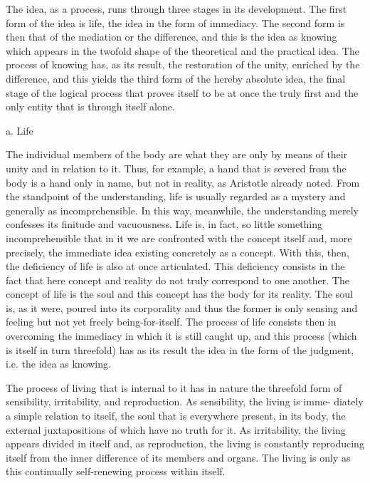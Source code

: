 The idea, as a process, runs through three stages in its development.
The first form of the idea is life, the idea in the form of immediacy.
The second form is then that of the mediation or the difference, and
this is the idea as knowing which appears in the twofold shape of
the theoretical and the practical idea.
The process of knowing has, as its result,
the restoration of the unity, enriched by the difference, and
this yields the third form of the hereby absolute idea,
the final stage of the logical process that proves itself to be at once
the truly first and the only entity that is through itself alone.

a. Life

The individual members of the body are what they are only by means
of their unity and in relation to it. Thus, for example, a hand that is severed
from the body is a hand only in name, but not in reality, as
Aristotle already noted. From the standpoint of the understanding, life is usually
regarded as a mystery and generally as incomprehensible. In this way, meanwhile,
the understanding merely confesses its finitude and vacuousness. Life is, in fact, so
little something incomprehensible that in it we are confronted with the concept
itself and, more precisely, the immediate idea existing concretely as a concept.
With this, then, the deficiency of life is also at once articulated. This deficiency
consists in the fact that here concept and reality do not truly correspond to one
another. The concept of life is the soul and this concept has the body for its reality.
The soul is, as it were, poured into its corporality and thus the former is only
sensing and feeling but not yet freely being-for-itself. The process of
life consists then in overcoming the immediacy in which it is still caught up, and
this process (which is itself in turn threefold) has as its result the idea in the form
of the judgment, i.e. the idea as knowing.

The process of living that is internal to it has in nature the threefold
form of sensibility, irritability, and reproduction. As sensibility, the living is imme-
diately a simple relation to itself, the soul that is everywhere present, in its body,
the external juxtapositions of which have no truth for it. As irritability, the living
appears divided in itself and, as reproduction, the living is constantly reproducing
itself from the inner difference of its members and organs. The living is only as
this continually self-renewing process within itself.

